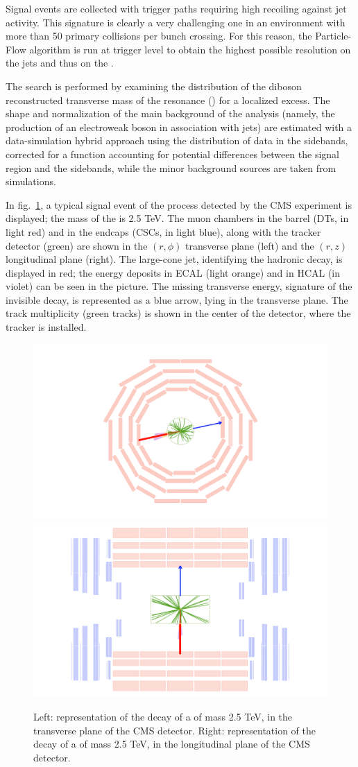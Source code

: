 \noindent Signal events are collected with trigger paths requiring high \met recoiling against jet activity. This signature is clearly a very challenging one in an environment with more than 50 primary collisions per bunch crossing. For this reason, the Particle-Flow algorithm is run at trigger level to obtain the highest possible resolution on the jets and thus on the \met.

\noindent The search is performed by examining the distribution of the diboson reconstructed transverse mass of the resonance \VZ (\mtVZ) for a localized excess. The shape and normalization of the main background of the analysis (namely, the production of an electroweak boson in association with jets) are estimated with a data-simulation hybrid approach using the distribution of data in the sidebands, corrected for a function accounting for potential differences between the signal region and the sidebands, while the minor background sources are taken from simulations.

\noindent In fig.~\ref{fig:event_display}, a typical signal event of the \Wpinv process detected by the CMS experiment is displayed; the mass of the \Wp is 2.5 TeV. The muon chambers in the barrel (DTs, in light red) and in the endcaps (CSCs, in light blue), along with the tracker detector (green) are shown in the $(r, \phi)$ transverse plane (left) and the $(r, z)$ longitudinal plane (right). The large-cone jet, identifying the \W hadronic decay, is displayed in red; the energy deposits in ECAL (light orange) and in HCAL (in violet) can be seen in the picture. The missing transverse energy, signature of the \Z invisible decay, is represented as a blue arrow, lying in the transverse plane. The track multiplicity (green tracks) is shown in the center of the detector, where the tracker is installed.

\begin{figure}[!htb]
  \centering
    \includegraphics[width=.5\textwidth]{evdisp/Wprime25Tev_rhophi_all.png}%
    \includegraphics[width=.5\textwidth]{evdisp/Wprime25Tev_rhoz_all.png}%

  \caption{Left: representation of the decay of a \Wp of mass 2.5 TeV, in the transverse plane of the CMS detector. Right: representation of the decay of a \Wp of mass 2.5 TeV, in the longitudinal plane of the CMS detector.}
  \label{fig:event_display}
\end{figure}
